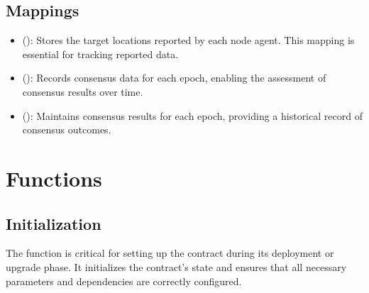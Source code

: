 \documentclass[a4paper,10pt,english]{sphinxmanual}
\begin{document}
\subsection{Mappings}
\label{\detokenize{docs_consensus_mechanism_contract:mappings}}\begin{itemize}
\item {} 
\sphinxAtStartPar
{} ():
Stores the target locations reported by each node agent. This mapping is essential for tracking reported data.

\item {} 
\sphinxAtStartPar
{} ():
Records consensus data for each epoch, enabling the assessment of consensus results over time.

\item {} 
\sphinxAtStartPar
{} ():
Maintains consensus results for each epoch, providing a historical record of consensus outcomes.

\end{itemize}


\section{Functions}
\label{\detokenize{docs_consensus_mechanism_contract:functions}}

\subsection{Initialization}
\label{\detokenize{docs_consensus_mechanism_contract:initialization}}
\sphinxAtStartPar
The  function is critical for setting up the contract during its deployment or upgrade phase. It initializes the contract’s state and ensures that all necessary parameters and dependencies are correctly configured.

\begin{sphinxVerbatim}[commandchars=\\\{\}]
\end{sphinxVerbatim}
\end{document}
